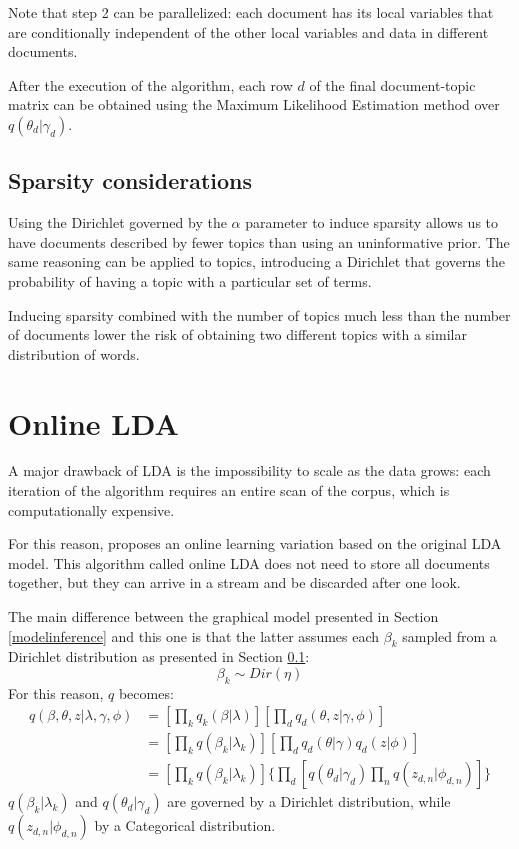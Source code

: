 Note that step 2 can be parallelized: each document has its local variables that are conditionally independent
of the other local variables and data in different documents.

After the execution of the algorithm, each row $d$ of the final document-topic matrix can be obtained using the Maximum Likelihood Estimation method over $q(\theta_d | \gamma_d)$.

\subsection{Sparsity considerations} \label{sparsity_lda}
Using the Dirichlet governed by the $\alpha$ parameter to induce sparsity
allows us to have documents described by fewer topics than using an uninformative prior.
The same reasoning can be applied to topics, introducing a Dirichlet that governs the
probability of having a topic with a particular set of terms.

Inducing sparsity combined with the number of topics much less than the number of documents
lower the risk of obtaining two different topics with a similar distribution of words.


\section{Online LDA}
A major drawback of LDA is the impossibility to scale as the data grows:
each iteration of the algorithm requires an entire scan of the corpus, which is computationally expensive.

For this reason, \cite{NIPS2010_3902} proposes an online learning variation based on the original LDA model.
This algorithm called online LDA does not need to store all documents together,
but they can arrive in a stream and be discarded after one look.

The main difference between the graphical model presented in Section \ref{modelinference} and this one
is that the latter assumes each $\beta_k$ sampled from a Dirichlet distribution as presented in Section \ref{sparsity_lda}:
\begin{equation}
    \beta_k \sim Dir(\eta)
\end{equation}
For this reason, $q$ becomes:
\begin{equation*}
    \begin{split}
        q(\beta, \theta, z| \lambda, \gamma, \phi) & = [\prod_k q_k(\beta | \lambda)] [\prod_d q_d(\theta, z | \gamma, \phi)] \\
        & = [\prod_k q(\beta_k | \lambda_k)] [\prod_d q_d(\theta | \gamma) q_d(z | \phi)] \\
        & = [\prod_k q(\beta_k | \lambda_k)] \{\prod_d [q(\theta_d | \gamma_d) \prod_n q(z_{d,n} | \phi_{d,n})]\}
    \end{split}
\end{equation*}
$q(\beta_k | \lambda_k)$ and $q(\theta_d | \gamma_d)$ are governed by a Dirichlet distribution, while $q(z_{d,n} | \phi_{d,n})$ by a Categorical distribution.

